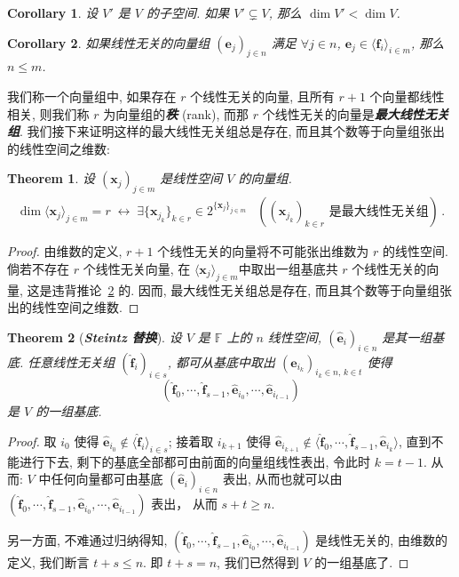 \documentclass[openany]{ctexbook}
\newcommand*{\indexbf}[1]{\emph{\textbf{#1}}\index{#1}} %
\theoremstyle{plain}
\newtheorem{theorem}{Theorem}[section] %
\newtheorem{corollary}{Corollary} %
\theoremstyle{definition}
\newcommand*{\basis}[1]{\hat{\boldsymbol{#1}}} %
\newcommand*{\bv}{\boldsymbol} %
\newcommand*{\IFF}{\;\leftrightarrow\;} %
\begin{document}
\begin{corollary}
	设 $V'$ 是 $V$ 的子空间. 如果 $V' \subsetneq V$, 那么 $\dim V' < \dim V$.
\end{corollary}

\begin{corollary}\label{corollary:向量组线性表出的向量组秩不多于自身}
	如果线性无关的向量组 $(\bv e_j)_{j \in n} $ 满足 $\forall j \in n$, $\bv e_j \in  \langle\bv f_i\rangle_{i \in m}$, 那么 $n \leq m$.
\end{corollary}

我们称一个向量组中, 如果存在 $r$ 个线性无关的向量, 且所有 $r + 1$ 个向量都线性相关, 则我们称 $r$ 为向量组的\indexbf{秩} (rank), 而那 $r$ 个线性无关的向量是\indexbf{最大线性无关组}.
我们接下来证明这样的最大线性无关组总是存在, 而且其个数等于向量组张出的线性空间之维数:

\begin{theorem}\label{corollary:秩与维数}
	设 $ (\bv x_j)_{j \in m}$ 是线性空间 $V$ 的向量组.
	\begin{align*}
		\dim \langle \bv x_j\rangle_{j \in m} = r
		\IFF
		\exists \{\bv x_{j_k}\}_{k \in r} \in 2^{\{\bv x_j\}_{j \in m}} 
		&\left( 	
			\text{$(\bv x_{j_k})_{k \in r}$ 是最大线性无关组}
		\right)\,.
	\end{align*}
\end{theorem}
\begin{proof}
	由维数的定义, $r + 1$ 个线性无关的向量将不可能张出维数为 $r$ 的线性空间.
	倘若不存在 $r$ 个线性无关向量, 在 $\langle \bv x_j\rangle_{j \in m} $中取出一组基底共 $r$ 个线性无关的向量, 这是违背推论~\ref{corollary:向量组线性表出的向量组秩不多于自身} 的. 
	因而, 最大线性无关组总是存在, 而且其个数等于向量组张出的线性空间之维数.
\end{proof}

\begin{theorem}[\indexbf{Steintz 替换}]\label{theorem: Steintz}
	设 $V$ 是 $\mathbb F$ 上的 $n$ 线性空间, $(\basis e_i)_{i \in n}$ 是其一组基底.
	任意线性无关组 $(\basis f_i)_{i \in s}$, 都可从基底中取出 $(\basis e_{i_k})_{i_k \in n,\, k \in t}$ 使得
	\begin{equation*}
		(\basis f_0, \cdots, \basis f_{s-1}, \basis e_{i_0}, \cdots, \basis e_{i_{t-1}})
	\end{equation*}
	是 $V$ 的一组基底.
\end{theorem}
\begin{proof}
	取 $i_0$ 使得 $\basis e_{i_0} \notin \langle\basis f_i\rangle_{i \in s}$; 
	接着取 $i_{k+1}$ 使得 $\basis e_{i_{k+1}} \notin \langle \basis f_0, \cdots, \basis f_{s-1}, \basis e_{i_k} \rangle $, 直到不能进行下去, 剩下的基底全部都可由前面的向量组线性表出, 令此时 $k = t - 1$.
	从而: $V$ 中任何向量都可由基底 $(\basis e_i)_{i \in n}$ 表出, 从而也就可以由
	$
		(\basis f_0, \cdots, \basis f_{s-1}, \basis e_{i_0}, \cdots, \basis e_{i_{t-1}})
	$ 表出， 从而 $s + t \geq n$. 

	另一方面, 不难通过归纳得知, 
	$
		(\basis f_0, \cdots, \basis f_{s-1}, \basis e_{i_0}, \cdots, \basis e_{i_{t-1}})
	$ 是线性无关的, 由维数的定义, 我们断言 $t + s \leq n$. 
	即 $t + s = n$, 我们已然得到 $V$ 的一组基底了.
\end{proof}
\end{document}
